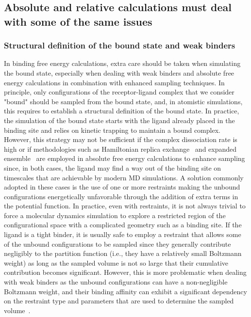 \documentclass[9pt,bestpractices]{livecoms}
\begin{document}
\subsection{Absolute and relative calculations must deal with some of the same issues}
\subsubsection{Structural definition of the bound state and weak binders}
In binding free energy calculations, extra care should be taken when simulating the bound state, especially when dealing with weak binders and absolute free energy calculations in combination with enhanced sampling techniques.
In principle, only configurations of the receptor-ligand complex that we consider "bound" should be sampled from the bound state, and, in atomistic simulations, this requires to establish a structural definition of the bound state.
In practice, the simulation of the bound state starts with the ligand already placed in the binding site and relies on kinetic trapping to maintain a bound complex.
However, this strategy may not be sufficient if the complex dissociation rate is high or if methodologies such as Hamiltonian replica exchange~\cite{bitetti-putzer2003generalized} and expanded ensemble~\cite{chodera2011replica} are employed in absolute free energy calculations to enhance sampling since, in both cases, the ligand may find a way out of the binding site on timescales that are achievable by modern MD simulations.
A solution commonly adopted in these cases is the use of one or more restraints making the unbound configurations energetically unfavorable through the addition of extra terms in the potential function.
In practice, even with restraints, it is not always trivial to force a molecular dynamics simulation to explore a restricted region of the configurational space with a complicated geometry such as a binding site.
If the ligand is a tight binder, it is usually safe to employ a restraint that allows some of the unbound configurations to be sampled since they generally contribute negligibly to the partition function (i.e., they have a relatively small Boltzmann weight) as long as the sampled volume is not so large that their cumulative contribution becomes significant.
However, this is more problematic when dealing with weak binders as the unbound configurations can have a non-negligible Boltzmann weight, and their binding affinity can exhibit a significant dependency on the restraint type and parameters that are used to determine the sampled volume~\cite{}.
\end{document}
